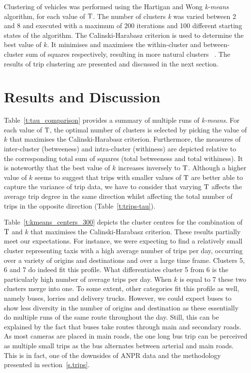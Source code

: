Clustering of vehicles was performed using the Hartigan and Wong \emph{k-means} algorithm, for each value of $\mathrm{T}$. The number of clusters \emph{k} was varied between 2 and 8 and executed with a maximum of 200 iterations and 100 different starting states of the algorithm. The Calinski-Harabasz criterion is used to determine the best value of $k$. It minimises and maximises the within-cluster and between-cluster sum of squares respectively, resulting in more natural clusters ~\cite{Kmeans}. The results of trip clustering are presented and discussed in the next section.

\section{Results and Discussion}\label{s.results}

Table~\ref{t:tau_comparison} provides a summary of multiple runs of \emph{k-means}. For each value of $\mathrm{T}$, the optimal number of clusters is selected by picking the value of $k$ that maximises the Calinski-Harabasz criterion. Furthermore, the measures of inter-cluster (betweeness) and intra-cluster (withiness) are depicted relative to the corresponding total sum of squares (total betweeness and total withiness). It is noteworthy that the best value of $k$ increases inversely to $\mathrm{T}$. Although a higher value of $k$ seems to suggest that trips with smaller values of $\mathrm{T}$ are better able to capture the variance of trip data, we have to consider that varying $\mathrm{T}$ affects the average trip degree in the same direction whilst affecting the total number of trips in the opposite direction (Table~\ref{t:trips-tau}).


Table~\ref{t:kmeans_centers_300} depicts the cluster centres for the combination of $\mathrm{T}$ and $k$ that maximises the Calinski-Harabasz criterion. These results partially meet our expectations. For instance, we were expecting to find a relatively small cluster representing taxis with a high average number of trips per day, occurring over a variety of origins and destinations and over a large time frame. Clusters 5, 6 and 7 do indeed fit this profile. What differentiates cluster 5 from 6 is the particularly high number of average trips per day. When $k$ is equal to 7 these two clusters merge into one. To some extent, other categories fit this profile as well, namely buses, lorries and delivery trucks. However, we could expect buses to show less diversity in the number of origins and destination as these essentially do multiple runs of the same route throughout the day. Still, this can be explained by the fact that buses take routes through main and secondary roads. As most cameras are placed in main roads, the one long bus trip can be perceived as multiple small trips as the bus alternates between arterial and main roads. This is in fact, one of the downsides of ANPR data and the methodology presented in section~\ref{s.trips}.

